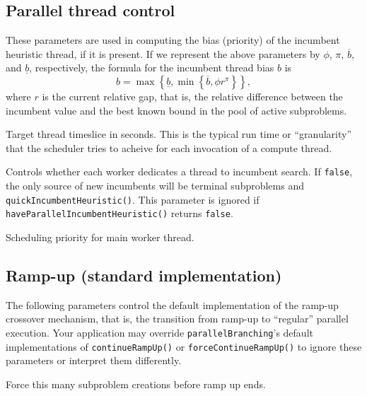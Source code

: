 \subsection{Parallel thread control}
\label{sec:pthread}
\vspace{-3ex}
\groupparams
{}
\groupparams
{}
\groupparams
{}
These parameters are used in computing the bias (priority) of the
incumbent heuristic thread, if it is present.  If we represent the
above parameters by $\phi$, $\pi$, $\overline{b}$, and
$\underline{b}$, respectively, the formula for the incumbent thread
bias $b$ is
$$
b = \max\left\{\underline{b},
    \min\left\{\overline{b}, \phi r^{\pi} \right\} \right\},
$$ 
where $r$ is the current relative gap, that is, the relative
difference between the incumbent value and the best known bound in the
pool of active subproblems.

Target thread timeslice in seconds.  This is the typical
run time or ``granularity'' that the scheduler tries to acheive for
each invocation of a compute thread.

Controls whether each worker dedicates a thread to incumbent search.
If \texttt{false}, the only source of new incumbents will be terminal
subproblems and  \texttt{quickIncumbentHeuristic()}.  This
parameter is ignored if \texttt{haveParallelIncumbentHeuristic()}
returns \texttt{false}.

Scheduling priority for main worker thread.


\subsection{Ramp-up (standard implementation)}
The following parameters control the default implementation of the
ramp-up crossover mechanism, that is, the transition from ramp-up to
``regular'' parallel execution.  Your application may override
\texttt{parallelBranching}'s default implementations of
\texttt{continueRampUp()} or \texttt{forceContinueRampUp()} to ignore
these parameters or interpret them differently.

Force this many subproblem creations before ramp up ends.


